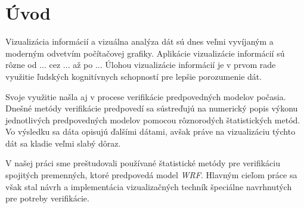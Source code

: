 \chapter{Úvod}
	
	
Vizualizácia informácií a vizuálna analýza dát sú dnes veľmi vyvíjaným a moderným odvetvím počítačovej grafiky. Aplikácie vizualizácie informácií sú rôzne od ... cez ... až po ... Úlohou vizualizácie informácií je v prvom rade využitie ľudských kognitívnych schopností pre lepšie porozumenie dát.

Svoje využitie našla aj v procese verifikácie predpovedných modelov počasia. Dnešné metódy verifikácie predpovedí sa sústreďujú na numerický popis výkonu jednotlivých predpovedných modelov pomocou rôznorodých štatistických metód. Vo výsledku sa dáta opisujú ďalšími dátami, avšak práve na vizualizáciu týchto dát sa kladie veľmi slabý dôraz.

V našej práci sme preštudovali používané štatistické metódy pre verifikáciu spojitých premenných, ktoré predpovedá model \textit{WRF}. Hlavným cieľom práce sa však stal návrh a implementácia vizualizačných techník špeciálne navrhnutých pre potreby verifikácie. 